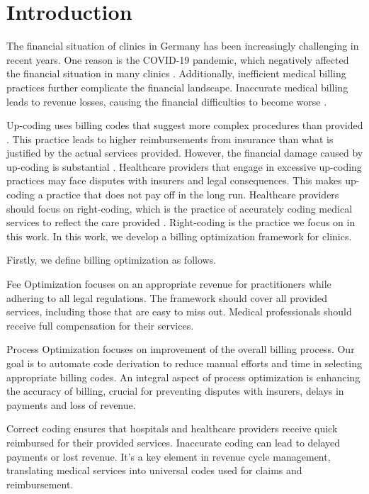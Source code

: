 \chapter{Introduction}\label{ch:introduction}

The financial situation of clinics in Germany has been increasingly challenging in recent years.
One reason is the COVID-19 pandemic, which negatively affected the financial situation in many clinics \cite{Gandjour2023-rn}.
Additionally, inefficient medical billing practices further complicate the financial landscape.
Inaccurate medical billing leads to revenue losses, causing the financial difficulties to become worse \cite{MedicalBillingErrorsImpact}.

Up-coding uses billing codes that suggest more complex procedures than provided \cite{coustasse2021upcoding}.
This practice leads to higher reimbursements from insurance than what is justified by the actual services provided.
However, the financial damage caused by up-coding is substantial \cite{Joiner2024}.
Healthcare providers that engage in excessive up-coding practices may face disputes with insurers and legal consequences.
This makes up-coding a practice that does not pay off in the long run.
Healthcare providers should focus on right-coding, which is the practice of accurately coding medical services to reflect the care provided \cite{Joiner2024}.
Right-coding is the practice we focus on in this work.
In this work, we develop a billing optimization framework for clinics.

Firstly, we define billing optimization as follows.
\begin{description}
    \item Fee Optimization focuses on an appropriate revenue for practitioners while adhering to all legal regulations.
    The framework should cover all provided services, including those that are easy to miss out.
    Medical professionals should receive full compensation for their services.
    \item Process Optimization focuses on improvement of the overall billing process.
    Our goal is to automate code derivation to reduce manual efforts and time in selecting appropriate billing codes.
    An integral aspect of process optimization is enhancing the accuracy of billing, crucial for preventing disputes with insurers, delays in payments and loss of revenue.
\end{description}
Correct coding ensures that hospitals and healthcare providers receive quick reimbursed for their provided services.
Inaccurate coding can lead to delayed payments or lost revenue.
It's a key element in revenue cycle management, translating medical services into universal codes used for claims and reimbursement.

